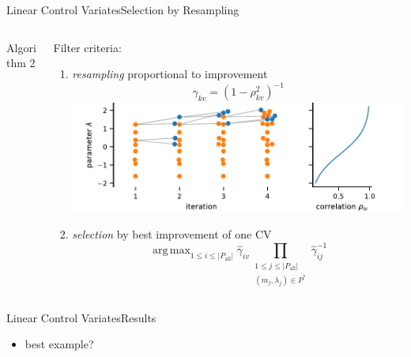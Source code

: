 \documentclass[10pt]{beamer}
\DeclareMathOperator*{\argmax}{arg\,max}
\newcommand{\bottomcite}[1]{\vspace*{\fill} {\scriptsize \parencite{#1}}}
\begin{document}
\begin{frame}{Linear Control Variates}{Selection by Resampling}
\begin{columns}
\begin{column}{.4\textwidth}
\begin{block}{Algorithm 2}
\begin{figure}
\begin{tikzpicture}[node distance=1.3cm,
                every node/.style={fill=white, font=\sffamily}, align=center]
                \end{tikzpicture}
                \end{figure}
            \end{block}
        \end{column}
        \begin{column}{.55\textwidth}
            Filter criteria:
            \begin{enumerate}
                \item \emph{resampling} proportional to improvement %
                    \[ \gamma_{kv} = (1 - \rho_{kv}^2)^{-1} \]
                    \includegraphics[width=\textwidth]{../gfx/resampling.pdf}
                \item \emph{selection} by best improvement of one CV
                    \[
\argmax_{1\leq i \leq \left|P_{\text{all}}\right|}
\hat{\gamma}_{iv}
    \prod_{\substack{1\leq j\leq {\left|P_{\text{all}}\right|}\\(m_j, \lambda_j)\in P^*}}
    \hat{\gamma}_{ij}^{-1}
\]
            \end{enumerate}
        \end{column}
    \end{columns}
    \bottomcite{backenkohler2021variance}
\end{frame}

\begin{frame}{Linear Control Variates}{Results}
  \begin{itemize}
    \item best example?
  \end{itemize}
\end{frame}
\end{document}
